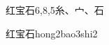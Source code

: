 \begin{entry}{红宝石}{6,8,5}{⽷、⼧、⽯}
  \begin{phonetics}{红宝石}{hong2bao3shi2}
  \end{phonetics}
\end{entry}
